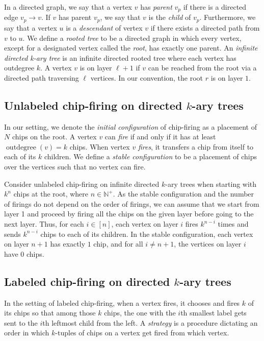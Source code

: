 \documentclass[final]{dmtcs-episciences}
\theoremstyle{definition}
\theoremstyle{remark}
\DeclareMathOperator{\outdeg}{outdegree}
\begin{document}
In a directed graph, we say that a vertex $v$ has \textit{parent} $v_p$ if there is a directed edge $v_p \to v$. If $v$ has parent $v_p$, we say that $v$ is the \textit{child} of $v_p$.  Furthermore, we say that a vertex $u$ is a \textit{descendant} of vertex $v$ if there exists a directed path from $v$ to $u$. We define a \textit{rooted tree} to be a directed graph in which every vertex, except for a designated vertex called the \textit{root}, has exactly one parent. An \textit{infinite directed k-ary tree} is an infinite directed rooted tree where each vertex has outdegree $k$.  A vertex $v$ is on layer $\ell+1$ if $v$ can be reached from the root via a directed path traversing $\ell$ vertices. In our convention, the root $r$ is on layer $1$.


\subsection{Unlabeled chip-firing on directed \texorpdfstring{$k$}{k}-ary trees}
\label{sec:unlabeled}

In our setting, we denote the \textit{initial configuration} of chip-firing as a placement of $N$ chips on the root. A vertex $v$ can \textit{fire} if and only if it has at least $\outdeg(v)=k$ chips. When vertex $v$ \textit{fires}, it transfers a chip from itself to each of its $k$ children. We define a \textit{stable configuration} to be a placement of chips over the vertices such that no vertex can fire.

Consider unlabeled chip-firing on infinite directed $k$-ary trees when starting with $k^n$ chips at the root, where $n \in \mathbb{N}^+$. As the stable configuration and the number of firings do not depend on the order of firings, we can assume that we start from layer 1 and proceed by firing all the chips on the given layer before going to the next layer. Thus, for each $i \in [n]$, each vertex on layer $i$ fires $k^{n-i}$ times and sends $k^{n-i}$ chips to each of its children. In the stable configuration, each vertex on layer $n + 1$ has exactly $1$ chip, and for all $i \neq n + 1$, the vertices on layer $i$ have $0$ chips.

\subsection{Labeled chip-firing on directed \texorpdfstring{$k$}{k}-ary trees}
\label{sec:labeled}
In the setting of labeled chip-firing, when a vertex fires, it chooses and fires $k$ of its chips so that among those $k$ chips, the one with the $i$th smallest label gets sent to the $i$th leftmost child from the left. A \textit{strategy} is a procedure dictating an order in which $k$-tuples of chips on a vertex get fired from which vertex.
\end{document}
